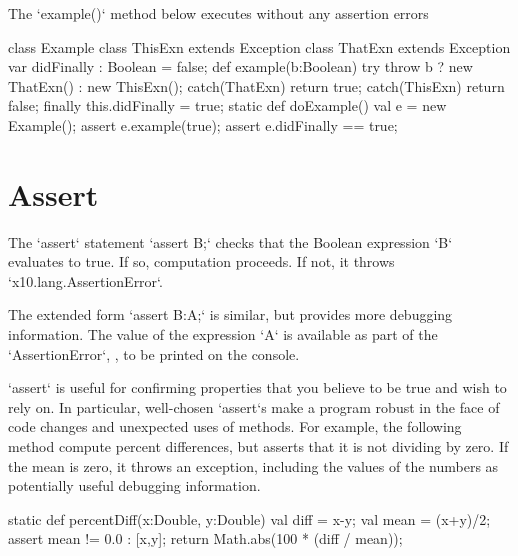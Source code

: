 \begin{ex}
The \xcd`example()` method below executes without any assertion errors
% 
\begin{xten}
class Example {
  class ThisExn extends Exception {}
  class ThatExn extends Exception {}
  var didFinally : Boolean = false;
  def example(b:Boolean) {
    try {
       throw b ? new ThatExn() : new ThisExn();
    }
    catch(ThatExn) {return true;}
    catch(ThisExn) {return false;}
    finally {
       this.didFinally = true;
    }
  }
  static def doExample() {
    val e = new Example();
    assert e.example(true);
    assert e.didFinally == true;
  }
}
\end{xten}
% 

\end{ex}


\section{Assert}

The \xcd`assert` statement 
\xcd`assert B;` 
checks that the Boolean expression \xcd`B` evaluates to true.  If so,
computation proceeds.  If not, it throws \xcd`x10.lang.AssertionError`.

The extended form 
\xcd`assert B:A;`
is similar, but provides more debugging information.  The value of the
expression \xcd`A` is available as part of the \xcd`AssertionError`, \eg, to
be printed on the console.

\begin{ex}
\xcd`assert` is useful for confirming properties that you believe to be true
and wish to rely on.  In particular, well-chosen \xcd`assert`s make a program
robust in the face of code changes and unexpected uses of methods.
For example, the following method compute percent differences, but asserts
that it is not dividing by zero.  If the mean is zero, it throws an exception,
including the values of the numbers as potentially useful debugging
information. 
\begin{xten}
static def percentDiff(x:Double, y:Double) {
  val diff = x-y;
  val mean = (x+y)/2;
  assert mean != 0.0  : [x,y]; 
  return Math.abs(100 * (diff / mean));
}
\end{xten}

\end{ex}


